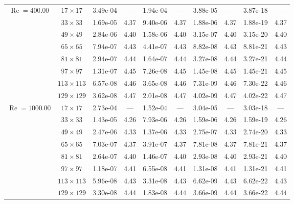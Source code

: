 \documentclass[preprint, 12pt]{elsarticle}
\begin{document}
{\begin{center}
\begin{table}[H]
{\begin{tabular*}{\textwidth}{@{\extracolsep\fill}cccccccccc@{}}
    \hline
    \multirow{7}{*}{$\operatorname{Re}=400.00$} & $17\times 17$ & 3.49e-04 & --- & 1.94e-04 & --- & 3.88e-05 & --- & 3.87e-18 & --- \\
    & $33\times 33$ & 1.69e-05 & 4.37 & 9.40e-06 & 4.37 & 1.88e-06 & 4.37 & 1.88e-19 & 4.37 \\
    & $49\times 49$ & 2.84e-06 & 4.40 & 1.58e-06 & 4.40 & 3.15e-07 & 4.40 & 3.15e-20 & 4.40 \\
    \multirow{3}{*}{$\operatorname{Wi}=10$} & $65\times 65$ & 7.94e-07 & 4.43 & 4.41e-07 & 4.43 & 8.82e-08 & 4.43 & 8.81e-21 & 4.43 \\
    & $81\times 81$ & 2.94e-07 & 4.44 & 1.64e-07 & 4.44 & 3.27e-08 & 4.44 & 3.27e-21 & 4.44 \\
    & $97\times 97$ & 1.31e-07 & 4.45 & 7.26e-08 & 4.45 & 1.45e-08 & 4.45 & 1.45e-21 & 4.45 \\
    & $113\times 113$ & 6.57e-08 & 4.46 & 3.65e-08 & 4.46 & 7.31e-09 & 4.46 & 7.30e-22 & 4.46 \\
    & $129\times 129$ & 3.62e-08 & 4.47 & 2.01e-08 & 4.47 & 4.02e-09 & 4.47 & 4.02e-22 & 4.47 \\
    \hline
    \multirow{7}{*}{$\operatorname{Re}=1000.00$} & $17\times 17$ & 2.73e-04 & --- & 1.52e-04 & --- & 3.04e-05 & --- & 3.03e-18 & --- \\
    & $33\times 33$ & 1.43e-05 & 4.26 & 7.93e-06 & 4.26 & 1.59e-06 & 4.26 & 1.59e-19 & 4.26 \\
    & $49\times 49$ & 2.47e-06 & 4.33 & 1.37e-06 & 4.33 & 2.75e-07 & 4.33 & 2.74e-20 & 4.33 \\
    \multirow{3}{*}{$\operatorname{Wi}=10$} & $65\times 65$ & 7.03e-07 & 4.37 & 3.91e-07 & 4.37 & 7.81e-08 & 4.37 & 7.81e-21 & 4.37 \\
    & $81\times 81$ & 2.64e-07 & 4.40 & 1.46e-07 & 4.40 & 2.93e-08 & 4.40 & 2.93e-21 & 4.40 \\
    & $97\times 97$ & 1.18e-07 & 4.41 & 6.55e-08 & 4.41 & 1.31e-08 & 4.41 & 1.31e-21 & 4.41 \\
    & $113\times 113$ & 5.96e-08 & 4.43 & 3.31e-08 & 4.43 & 6.62e-09 & 4.43 & 6.62e-22 & 4.43 \\
    & $129\times 129$ & 3.30e-08 & 4.44 & 1.83e-08 & 4.44 & 3.66e-09 & 4.44 & 3.66e-22 & 4.44 \\
    \hline
    \end{tabular*}
}
\end{table}
\end{center}
\begin{center}
\begin{table}[H]

\end{table}
\end{center}}
\end{document}
